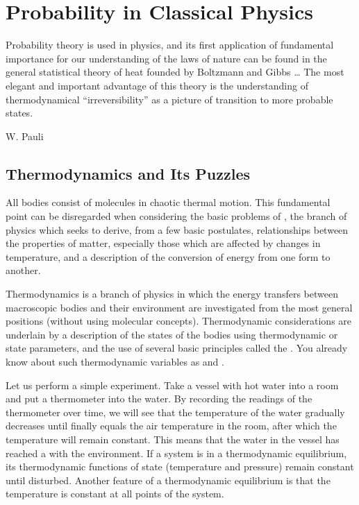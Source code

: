 \chapter{Probability in Classical Physics}
\epigraph{Probability theory is used in physics, and its first application of fundamental importance for our understanding of the laws of nature can be found in the general statistical theory of heat founded by Boltzmann and	 Gibbs \ldots{} 
The most elegant and important advantage of this theory is the understanding of thermodynamical ``irreversibility'' as a picture of transition to more probable states.}  {W. Pauli}

\section{Thermodynamics and Its Puzzles }


All bodies consist of molecules in chaotic thermal motion. This fundamental point can be disregarded when considering the basic problems of , the branch of physics which seeks to derive, from a few basic postulates, relationships between the properties of matter, especially those which are affected by changes in temperature, and a description of the conversion of energy from one form to another.

Thermodynamics is a branch of physics in which the energy transfers between macroscopic bodies and their environment are investigated from the most general positions (without using molecular concepts). Thermodynamic considerations are underlain by a description of the states of the bodies using thermodynamic  or state parameters, and the use of several basic principles called the . You already know about such thermodynamic variables as  and .

 Let us perform a simple experiment. Take a vessel with hot water into a room and put a thermometer into the water. By recording the readings of the thermometer over time, we will see that the temperature of the water gradually decreases until finally equals the air temperature in the room, after which the temperature will remain constant. This means that the water in the vessel has reached a  with the environment. If a system is in a thermodynamic equilibrium, its thermodynamic functions of state (temperature and pressure) remain constant until disturbed. Another feature of a thermodynamic equilibrium is that the temperature is constant at all points of the system.


